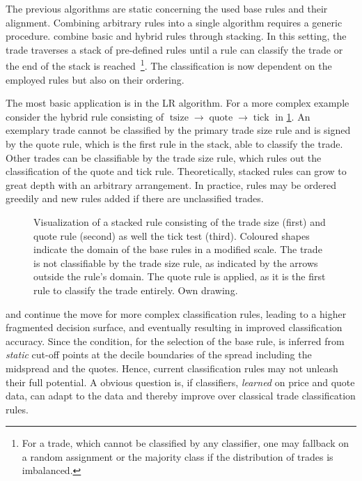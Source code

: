 The previous algorithms are static concerning the used base rules and their alignment. Combining arbitrary rules into a single algorithm requires a generic procedure. \textcite[][18]{grauerOptionTradeClassification2022} combine basic and hybrid rules through stacking. In this setting, the trade traverses a stack of pre-defined rules until a rule can classify the trade or the end of the stack is reached~\footnote{For a trade, which cannot be classified by any classifier, one may fallback on a random assignment or the majority class if the distribution of trades is imbalanced.}. The classification is now dependent on the employed rules but also on their ordering.

The most basic application is in the \gls{LR} algorithm. For a more complex example consider the hybrid rule consisting of $\operatorname{tsize} \to \operatorname{quote} \to \operatorname{tick}$ in \cref{fig:stacking-algo}. An exemplary trade cannot be classified by the primary trade size rule and is signed by the quote rule, which is the first rule in the stack, able to classify the trade. Other trades can be classifiable by the trade size rule, which rules out the classification of the quote and tick rule. Theoretically, stacked rules can grow to great depth with an arbitrary arrangement. In practice, rules may be ordered greedily and new rules added if there are unclassified trades.

\begin{figure}[ht!]
    \centering
    
    \caption[Visualization Of A Stacked Rule]{Visualization of a stacked rule consisting of the trade size (first) and quote rule (second) as well the tick test (third). Coloured shapes indicate the domain of the base rules in a modified scale. The trade is not classifiable by the trade size rule, as indicated by the arrows outside the rule's domain. The quote rule is applied, as it is the first rule to classify the trade entirely. Own drawing.}
    \label{fig:stacking-algo}
\end{figure}

\textcite[][3811]{chakrabartyTradeClassificationAlgorithms2007} and \textcite[][18]{grauerOptionTradeClassification2022} continue the move for more complex classification rules, leading to a higher fragmented decision surface, and eventually resulting in improved classification accuracy. Since the condition, for the selection of the base rule, is inferred from \emph{static} cut-off points at the decile boundaries of the spread including the midspread and the quotes. Hence, current classification rules may not unleash their full potential. A obvious question is, if classifiers, \emph{learned} on price and quote data, can adapt to the data and thereby improve over classical trade classification rules.

